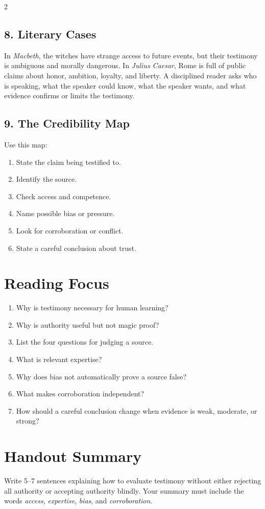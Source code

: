 \documentclass[12pt]{article}
\begin{document}
\begin{multicols}{2}
\subsection*{8. Literary Cases}
In \textit{Macbeth}, the witches have strange access to future events, but their testimony is ambiguous and morally dangerous. In \textit{Julius Caesar}, Rome is full of public claims about honor, ambition, loyalty, and liberty. A disciplined reader asks who is speaking, what the speaker could know, what the speaker wants, and what evidence confirms or limits the testimony.

\subsection*{9. The Credibility Map}
Use this map:
\begin{enumerate}[leftmargin=*,itemsep=0.12em]
\item State the claim being testified to.
\item Identify the source.
\item Check access and competence.
\item Name possible bias or pressure.
\item Look for corroboration or conflict.
\item State a careful conclusion about trust.
\end{enumerate}

\section*{Reading Focus}
\begin{enumerate}[leftmargin=*]
\item Why is testimony necessary for human learning?
\item Why is authority useful but not magic proof?
\item List the four questions for judging a source.
\item What is relevant expertise?
\item Why does bias not automatically prove a source false?
\item What makes corroboration independent?
\item How should a careful conclusion change when evidence is weak, moderate, or strong?
\end{enumerate}

\section*{Handout Summary}
Write 5--7 sentences explaining how to evaluate testimony without either rejecting all authority or accepting authority blindly. Your summary must include the words \textit{access}, \textit{expertise}, \textit{bias}, and \textit{corroboration}.
\end{multicols}
\end{document}
